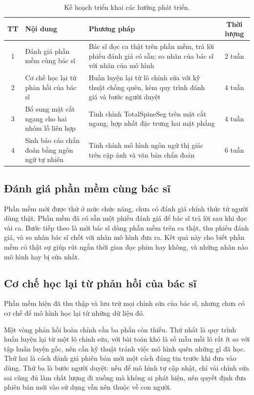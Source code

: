 \begin{table}[htbp]
\centering
\caption{Kế hoạch triển khai các hướng phát triển.}
\label{tab:roadmap}
\renewcommand{\arraystretch}{1.3}
\setlength{\tabcolsep}{4pt}
\begin{tabular}{|c|p{4.4cm}|p{4.6cm}|c|}
\hline
\textbf{TT} & \textbf{Nội dung} & \textbf{Phương pháp} & \textbf{Thời lượng} \\ \hline
1 & Đánh giá phần mềm cùng bác sĩ & Bác sĩ đọc ca thật trên phần mềm, trả lời phiếu đánh giá có sẵn; so nhãn của bác sĩ với nhãn của mô hình & 2 tuần \\ \hline
2 & Cơ chế học lại từ phản hồi của bác sĩ & Huấn luyện lại từ lô chỉnh sửa với kỹ thuật chống quên, kèm quy trình đánh giá và bước người duyệt & 4 tuần \\ \hline
3 & Bổ sung mặt cắt ngang cho hai nhóm lỗ liên hợp & Tinh chỉnh TotalSpineSeg trên mặt cắt ngang, hợp nhất đặc trưng hai mặt phẳng & 4 tuần \\ \hline
4 & Sinh báo cáo chẩn đoán bằng ngôn ngữ tự nhiên & Tinh chỉnh mô hình ngôn ngữ thị giác trên cặp ảnh và văn bản chẩn đoán & 6 tuần \\ \hline
\end{tabular}
\end{table}

\subsection{Đánh giá phần mềm cùng bác sĩ}

Phần mềm mới được thử ở mức chức năng, chưa có đánh giá chính thức từ người dùng thật. Phần mềm đã có sẵn một phiếu đánh giá để bác sĩ trả lời sau khi đọc vài ca. Bước tiếp theo là mời bác sĩ dùng phần mềm trên ca thật, thu phiếu đánh giá, và so nhãn bác sĩ chốt với nhãn mô hình đưa ra. Kết quả này cho biết phần mềm có thật sự giúp rút ngắn thời gian đọc phim hay không, và những nhãn nào mô hình hay bị sửa nhất.

\subsection{Cơ chế học lại từ phản hồi của bác sĩ}

Phần mềm hiện đã thu thập và lưu trữ mọi chỉnh sửa của bác sĩ, nhưng chưa có cơ chế để mô hình học lại từ những dữ liệu đó.

Một vòng phản hồi hoàn chỉnh cần ba phần còn thiếu. Thứ nhất là quy trình huấn luyện lại từ một lô chỉnh sửa, với bài toán khó là số mẫu mỗi lô rất ít so với tập huấn luyện gốc, nên cần kỹ thuật tránh việc mô hình quên những gì đã học. Thứ hai là cách đánh giá phiên bản mới một cách đáng tin trước khi đưa vào dùng. Thứ ba là bước người duyệt: nếu để mô hình tự cập nhật, chỉ vài chỉnh sửa sai cũng đủ làm chất lượng đi xuống mà không ai phát hiện, nên quyết định đưa phiên bản mới vào sử dụng vẫn nên thuộc về con người.

